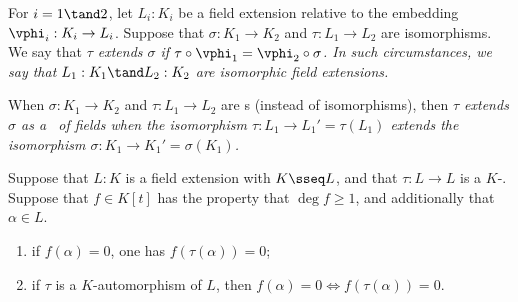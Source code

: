 \documentclass{article}
\begin{document}
\begin{tdefinition}
  For \( i = 1 \tand 2 \), let \( L_i : K_i \) be a field extension relative to the embedding \( \vphi_i : K_i\to L_i \).
  Suppose that \( \sigma : K_1\to K_2 \) and \( \tau:L_1\to L_2 \) are isomorphisms.
  We say that \it{\( \tau \) extends \( \sigma \)} if \( \tau\circ\vphi_1 = \vphi_2\circ\sigma \).
  In such circumstances, we say that \( L_1 : K_1 \tand L_2 : K_2 \) are \it{isomorphic field extensions}.
  \begin{center}
  \end{center}
  When \( \sigma:K_1\to K_2 \) and \( \tau:L_1\to L_2 \) are \homo s (instead of isomorphisms), then \it{\( \tau \) extends \( \sigma \) as a \homo~of fields} when the isomorphism \( \tau:L_1\to L_1' = \tau(L_1) \) extends the isomorphism \( \sigma:K_1\to K_1' = \sigma(K_1) \).
\end{tdefinition}


\begin{tlemma}
  Suppose that \( L:K \) is a field extension with \( K\sseq L \), and that \( \tau:L\to L \) is a \( K \)-\homo.
  Suppose that \( f\in K[t] \) has the property that \( \deg f \geq 1 \), and additionally that \( \alpha\in L \).
  \begin{enumerate}[label=(\roman*)]
    \item if \( f(\alpha) = 0 \), one has \( f(\tau(\alpha)) = 0 \);
    \item if \( \tau \) is a \( K \)-automorphism of \( L \), then \( f(\alpha) = 0 \iff f(\tau(\alpha)) = 0 \).
  \end{enumerate}
\end{tlemma}
\end{document}

